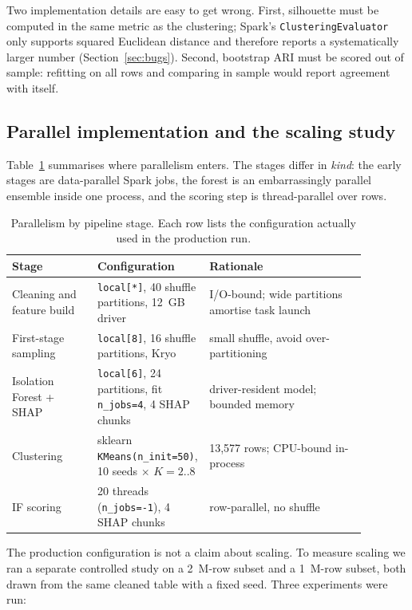 \documentclass[11pt,a4paper]{article}
\newcommand{\code}[1]{\texttt{\small #1}}
\begin{document}
Two implementation details are easy to get wrong. First, silhouette must be computed in the same metric as the clustering; Spark's \code{ClusteringEvaluator} only supports squared Euclidean distance and therefore reports a systematically larger number (Section~\ref{sec:bugs}). Second, bootstrap ARI must be scored out of sample: refitting on all rows and comparing in sample would report agreement with itself.

\subsection{Parallel implementation and the scaling study}

Table~\ref{tab:parallel-levels} summarises where parallelism enters. The stages differ in \emph{kind}: the early stages are data-parallel Spark jobs, the forest is an embarrassingly parallel ensemble inside one process, and the scoring step is thread-parallel over rows.

\begin{table}[t]
\centering
\small
\caption{Parallelism by pipeline stage. Each row lists the configuration actually used in the production run.}
\label{tab:parallel-levels}
\begin{tabular}{p{0.24\linewidth}p{0.20\linewidth}p{0.44\linewidth}}
\toprule
Stage & Configuration & Rationale \\
\midrule
Cleaning and feature build & \code{local[*]}, 40 shuffle partitions, 12~GB driver & I/O-bound; wide partitions amortise task launch \\
First-stage sampling & \code{local[8]}, 16 shuffle partitions, Kryo & small shuffle, avoid over-partitioning \\
Isolation Forest + SHAP & \code{local[6]}, 24 partitions, fit \code{n\_jobs=4}, 4 SHAP chunks & driver-resident model; bounded memory \\
Clustering & sklearn \code{KMeans(n\_init=50)}, 10 seeds $\times$ $K=2..8$ & 13{,}577 rows; CPU-bound in-process \\
IF scoring & 20 threads (\code{n\_jobs=-1}), 4 SHAP chunks & row-parallel, no shuffle \\
\bottomrule
\end{tabular}
\end{table}

The production configuration is not a claim about scaling. To measure scaling we ran a separate controlled study on a 2~M-row subset and a 1~M-row subset, both drawn from the same cleaned table with a fixed seed. Three experiments were run:
\end{document}
